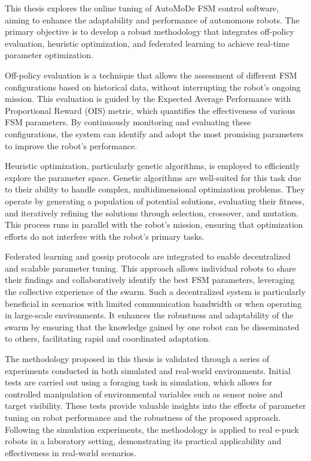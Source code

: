 \documentclass{ULBreport}
\begin{document}
This thesis explores the online tuning of AutoMoDe FSM control software, aiming to enhance the adaptability and performance of autonomous robots. The primary objective is to develop a robust methodology that integrates off-policy evaluation, heuristic optimization, and federated learning to achieve real-time parameter optimization.

Off-policy evaluation is a technique that allows the assessment of different FSM configurations based on historical data, without interrupting the robot's ongoing mission. This evaluation is guided by the Expected Average Performance with Proportional Reward (OIS) metric, which quantifies the effectiveness of various FSM parameters. By continuously monitoring and evaluating these configurations, the system can identify and adopt the most promising parameters to improve the robot's performance.

Heuristic optimization, particularly genetic algorithms, is employed to efficiently explore the parameter space. Genetic algorithms are well-suited for this task due to their ability to handle complex, multidimensional optimization problems. They operate by generating a population of potential solutions, evaluating their fitness, and iteratively refining the solutions through selection, crossover, and mutation. This process runs in parallel with the robot's mission, ensuring that optimization efforts do not interfere with the robot's primary tasks.

Federated learning and gossip protocols are integrated to enable decentralized and scalable parameter tuning. This approach allows individual robots to share their findings and collaboratively identify the best FSM parameters, leveraging the collective experience of the swarm. Such a decentralized system is particularly beneficial in scenarios with limited communication bandwidth or when operating in large-scale environments. It enhances the robustness and adaptability of the swarm by ensuring that the knowledge gained by one robot can be disseminated to others, facilitating rapid and coordinated adaptation.

The methodology proposed in this thesis is validated through a series of experiments conducted in both simulated and real-world environments. Initial tests are carried out using a foraging task in simulation, which allows for controlled manipulation of environmental variables such as sensor noise and target visibility. These tests provide valuable insights into the effects of parameter tuning on robot performance and the robustness of the proposed approach. Following the simulation experiments, the methodology is applied to real e-puck robots in a laboratory setting, demonstrating its practical applicability and effectiveness in real-world scenarios.
\end{document}

